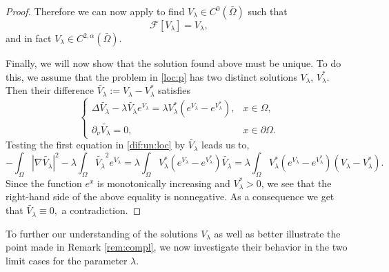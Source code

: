 \documentclass[12pt,a4paper]{amsart}
\theoremstyle{definition}
\theoremstyle{remark}
\numberwithin{equation}{section}
\numberwithin{theorem}{section}
\begin{document}
\begin{proof}
Therefore we can now apply \cite[Theorem 9.2.2.4]{Evans} to find $V_\lambda \in C^0(\bar\Omega)$ such that 
$$
  \mathcal{F}[ V_\lambda ] = V_\lambda,
$$
 and in fact $V_\lambda\in C^{2,\alpha}(\bar{\Omega}).$


Finally, we will now show that the solution found above must be unique. To do this, we assume that the problem in \eqref{loc:p} has two distinct solutions $V_{\lambda}$, $V_{\lambda}^*$. Then their difference $\tilde{V_\lambda}:= V_{\lambda}-V_{\lambda}^*$ satisfies 
\begin{equation}\label{dif:un:loc}
\left\{\begin{array}{lr}
\Delta \tilde{V_\lambda}-\lambda\tilde{V_\lambda}e^{V_{\lambda}}=\lambda V_{\lambda}^*(e^{V_{\lambda}}-e^{V_{\lambda}^*}),& x\in\Omega,\\
\partial_\nu \tilde{V_\lambda}=0,& x\in\partial\Omega. 
\end{array}\right.
\end{equation}   
Testing the first equation in \eqref{dif:un:loc} by $\tilde{V_\lambda}$ leads us to,
$$
-\int_\Omega|\nabla\tilde{V_\lambda} |^2-\lambda\int_\Omega \tilde{V_\lambda}^2 e^{V_{\lambda}}=\lambda\int_\Omega V_{\lambda}^*(e^{V_{\lambda}}-e^{V_{\lambda}^*}) \tilde{V_\lambda} = \lambda\int_\Omega V_{\lambda}^*(e^{V_{\lambda}}-e^{V_{\lambda}^*}) (V_{\lambda}-V_{\lambda}^*).
$$ 
Since the function $e^x$ is monotonically increasing and $V_{\lambda}^*>0$, we see that the right-hand side of the above equality is nonnegative. As a consequence we get that $\tilde{V_\lambda}\equiv 0,$ a contradiction.

\end{proof}

To further our understanding of the solutions $V_\lambda$ as well as better illustrate the point made in Remark \ref{rem:compl}, we now investigate their behavior in the two limit cases for the parameter $\lambda$.
\end{document}
